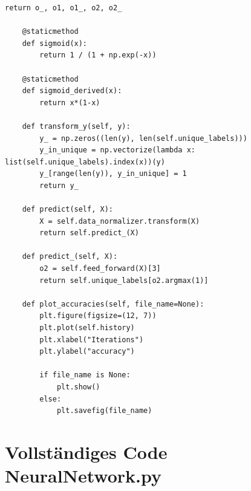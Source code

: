 \begin{lstlisting}[style=py]
        return o_, o1, o1_, o2, o2_

    @staticmethod
    def sigmoid(x):
        return 1 / (1 + np.exp(-x))

    @staticmethod
    def sigmoid_derived(x):
        return x*(1-x)

    def transform_y(self, y):
        y_ = np.zeros((len(y), len(self.unique_labels)))
        y_in_unique = np.vectorize(lambda x: list(self.unique_labels).index(x))(y)
        y_[range(len(y)), y_in_unique] = 1
        return y_

    def predict(self, X):
        X = self.data_normalizer.transform(X)
        return self.predict_(X)

    def predict_(self, X):
        o2 = self.feed_forward(X)[3]
        return self.unique_labels[o2.argmax(1)]

    def plot_accuracies(self, file_name=None):
        plt.figure(figsize=(12, 7))
        plt.plot(self.history)
        plt.xlabel("Iterations")
        plt.ylabel("accuracy")

        if file_name is None:
            plt.show()
        else:
            plt.savefig(file_name)

\end{lstlisting}

\section*{Vollständiges Code NeuralNetwork.py}

